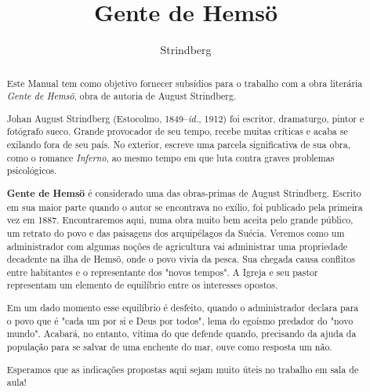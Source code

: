 \documentclass[12pt]{extarticle}
\begin{document}

\newcommand{\AutorLivro}{Strindberg}
\newcommand{\TituloLivro}{Gente de Hemsö}
\newcommand{\Tema}{Ficção, mistério e fantasia}
\newcommand{\Genero}{Romance}
\newcommand{\imagemCapa}{./images/PNLD0039-01.png}
\newcommand{\issnppub}{---}
\newcommand{\issnepub}{---}
\newcommand{\colaborador}{{Bruno Gradella e Vicente Castro} Sofia Boldrini (edição)}


\title{\TituloLivro}
\author{\AutorLivro}
\def\authornotes{\colaborador}

\date{}
\maketitle

\baselineskip\par

\begin{abstract}
Este Manual tem como objetivo fornecer subsídios para o trabalho com a
obra literária \emph{Gente de Hemsö}, obra de autoria de August
Strindberg.

Johan August Strindberg (Estocolmo, 1849--\textit{id.}, 1912) 
foi escritor, dramaturgo, pintor e fotógrafo sueco. Grande provocador
de seu tempo, recebe muitas críticas e acaba se exilando fora de 
seu país. No exterior, escreve uma parcela significativa de sua obra,
como o romance \textit{Inferno}, ao mesmo tempo em que luta contra graves 
problemas psicológicos.

\textbf{Gente de Hemsö} é considerado uma das obras-primas de August Strindberg. 
Escrito em sua maior parte quando o autor se encontrava no exílio, foi publicado 
pela primeira vez em 1887. Encontraremos aqui, numa obra muito bem aceita pelo grande 
público, um retrato do povo e das paisagens dos arquipélagos da Suécia.
Veremos como um administrador com algumas noções de agricultura vai administrar uma 
propriedade decadente na ilha de Hemsö, onde o povo vivia da pesca. Sua chegada causa 
conflitos entre habitantes e o representante dos "novos tempos". A Igreja e seu 
pastor representam um elemento de equilíbrio entre os interesses opostos.

Em um dado momento esse equilíbrio é desfeito, quando o administrador declara
para o povo que é "cada um por si e Deus por todos", lema do egoísmo predador
do "novo mundo". Acabará, no entanto, vítima do que defende quando, precisando
da ajuda da população para se salvar de uma enchente do mar, ouve como resposta
um não.

Esperamos que as indicações propostas aqui sejam muito úteis no trabalho em
sala de aula! 
\end{abstract}
\end{document}
